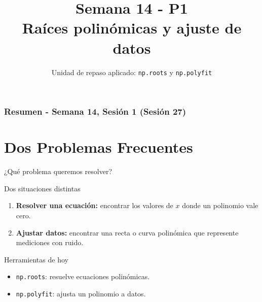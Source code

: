 \documentclass[10pt]{beamer}
\title[Semana 14 - P1]{Semana 14 - P1\\Raíces polinómicas y ajuste de datos}
\subtitle{Unidad de repaso aplicado: \texttt{np.roots} y \texttt{np.polyfit}}
\begin{document}
\myfront{}

\begin{frame}
  \titlepage
\end{frame}

\begin{frame}
  \frametitle{Resumen - Semana 14, Sesión 1 (Sesión 27)}
  \tableofcontents
\end{frame}


\section{Dos Problemas Frecuentes}

\begin{frame}{¿Qué problema queremos resolver?}
  \begin{block}{Dos situaciones distintas}
    \begin{enumerate}
      \item \textbf{Resolver una ecuación:} encontrar los valores de \(x\) donde un polinomio vale cero.
      \item \textbf{Ajustar datos:} encontrar una recta o curva polinómica que represente mediciones con ruido.
    \end{enumerate}
  \end{block}

  \begin{alertblock}{Herramientas de hoy}
    \begin{itemize}
      \item \texttt{np.roots}: resuelve ecuaciones polinómicas.
      \item \texttt{np.polyfit}: ajusta un polinomio a datos.
    \end{itemize}
  \end{alertblock}
\end{frame}
\end{document}
